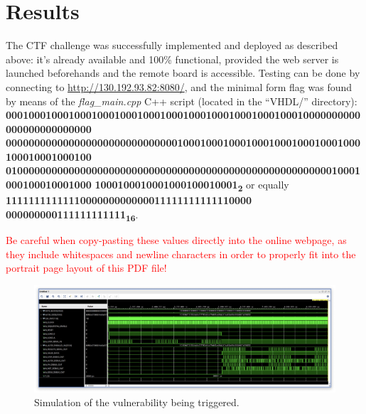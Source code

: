 \chapter{Results}
\label{Chapter5}
The CTF challenge was successfully implemented and deployed as described above: it's already available and 100\% functional, provided the web server is launched beforehands and the remote board is accessible.
Testing can be done by connecting to \url{http://130.192.93.82:8080/}, and the minimal form flag was found by means of the \emph{flag\_main.cpp} C++ script (located in the ``VHDL/'' directory):
\newline\textbf{00010001000100010001000100010001000100010001000100010000000000000000000000000}
\newline\textbf{00000000000000000000000000000010001000100010001000100010001000100010001000100}
\newline\textbf{01000000000000000000000000000000000000000000000000000000010001000100010001000}
\newline\textbf{1000100010001000100010001\textsubscript{2}} or equally \textbf{1111111111111000000000000011111111111110000}
\newline\textbf{000000000111111111111\textsubscript{16}}.

\textcolor{red}{Be careful when copy-pasting these values directly into the online webpage, as they include whitespaces and newline characters in order to properly fit into the portrait page layout of this PDF file!}
\begin{figure}[!ht]
\vspace{0.5cm}
\includegraphics[width=\textwidth]{images/Waves.png}
\caption{Simulation of the vulnerability being triggered.}
\end{figure}
